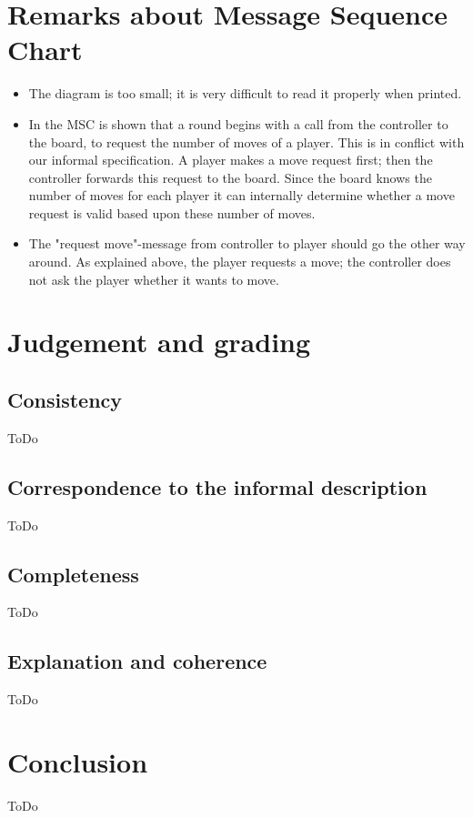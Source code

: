 \documentclass[a4paper,11pt]{article}
\begin{document}
    \section{Remarks about Message Sequence Chart}
    \begin{itemize}
        \item The diagram is too small; it is very difficult to read it properly when printed.
        \item In the MSC is shown that a round begins with a call from the controller to the board, to request the number of moves of a player. This is in conflict with our informal specification. A player makes a move request first; then the controller forwards this request to the board. Since the board knows the number of moves for each player it can internally determine whether a move request is valid based upon these number of moves.
        \item The "request move"-message from controller to player should go the other way around. As explained above, the player requests a move; the controller does not ask the player whether it wants to move.
    \end{itemize}


    \section{Judgement and grading}
    \subsection{Consistency}
    ToDo

    \subsection{Correspondence to the informal description}
    ToDo

    \subsection{Completeness}
    ToDo

    \subsection{Explanation and coherence}
    ToDo

    \section{Conclusion}
    ToDo
\end{document}
